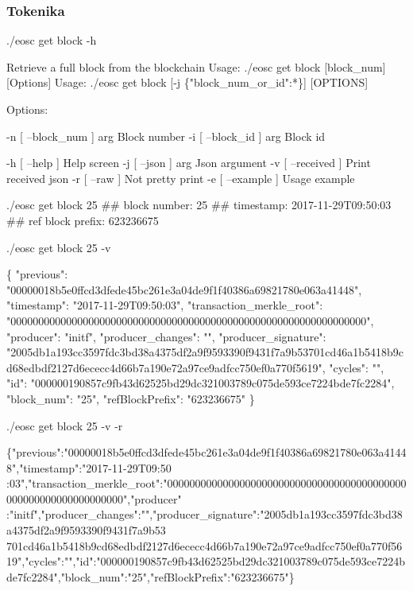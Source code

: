 \subsubsection*{Tokenika}


\begin{DoxyCode}
./eosc get block -h
\end{DoxyCode}
 
\begin{DoxyCode}
Retrieve a full block from the blockchain
Usage: ./eosc get block [block\_num] [Options]
Usage: ./eosc get block [-j \{"block\_num\_or\_id":*\}] [OPTIONS]

Options:

  -n [ --block\_num ] arg  Block number
  -i [ --block\_id ] arg   Block id

  -h [ --help ]           Help screen
  -j [ --json ] arg       Json argument
  -v [ --received ]       Print received json
  -r [ --raw ]            Not pretty print
  -e [ --example ]        Usage example
\end{DoxyCode}
 
\begin{DoxyCode}
./eosc get block 25
##         block number: 25
##            timestamp: 2017-11-29T09:50:03
##     ref block prefix: 623236675
\end{DoxyCode}
 
\begin{DoxyCode}
./eosc get block 25 -v
\end{DoxyCode}
 
\begin{DoxyCode}
\{
    "previous": "00000018b5e0ffcd3dfede45bc261e3a04de9f1f40386a69821780e063a41448",
    "timestamp": "2017-11-29T09:50:03",
    "transaction\_merkle\_root": "0000000000000000000000000000000000000000000000000000000000000000",
    "producer": "initf",
    "producer\_changes": "",
    "producer\_signature":
       "2005db1a193cc3597fdc3bd38a4375df2a9f9593390f9431f7a9b53701cd46a1b5418b9cd68edbdf2127d6ececc4d66b7a190e72a97ce9adfcc750ef0a770f5619",
    "cycles": "",
    "id": "000000190857c9fb43d62525bd29dc321003789c075de593ce7224bde7fc2284",
    "block\_num": "25",
    "refBlockPrefix": "623236675"
\}
\end{DoxyCode}
 
\begin{DoxyCode}
./eosc get block 25 -v -r
\end{DoxyCode}
 
\begin{DoxyCode}

      \{"previous":"00000018b5e0ffcd3dfede45bc261e3a04de9f1f40386a69821780e063a41448","timestamp":"2017-11-29T09:50
      :03","transaction\_merkle\_root":"0000000000000000000000000000000000000000000000000000000000000000","producer"
      :"initf","producer\_changes":"","producer\_signature":"2005db1a193cc3597fdc3bd38a4375df2a9f9593390f9431f7a9b53
      701cd46a1b5418b9cd68edbdf2127d6ececc4d66b7a190e72a97ce9adfcc750ef0a770f5619","cycles":"","id":"000000190857c9fb43d62525bd29dc321003789c075de593ce7224bde7fc2284","block\_num":"25","refBlockPrefix":"623236675"\}
\end{DoxyCode}
 
